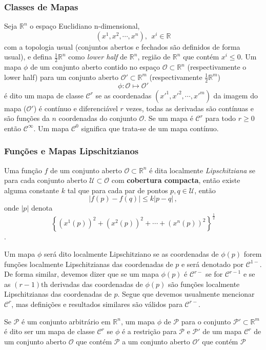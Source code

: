 \documentclass[25pt]{article}
\numberwithin{equation}{subsection} %
\newcommand{\Oop}{\mathcal{O}}
\newcommand{\Cop}{\mathcal{C}}
\newcommand{\Uop}{\mathcal{U}}
\newcommand{\Pop}{\mathcal{P}}
\newcommand{\Rbb}{\mathbb{R}}
\begin{document}
\subsubsection{Classes de Mapas}
Seja $\mathbb{R}^{n}$ o espaço Euclidiano n-dimensional, $$\left(x^1,x^2,\cdots,x^n\right),~~x^i\in\mathbb{R}$$ com a topologia usual (conjuntos abertos e fechados são definidos de forma usual), e defina $\frac{1}{2}\mathbb{R}^{n}$ como \textit{lower half} de $\mathbb{R}^{n}$, região de $\mathbb{R}^{n}$ que contém $x^{i}\leq 0$. Um mapa $\phi$ de um conjunto aberto contido no espaço $\mathcal{O}\subset\mathbb{R}^{n}$ (respectivamente o lower half) para um conjunto aberto $\mathcal{O}'\subset \mathbb{R}^{m}$ (respectivamente $\frac{1}{2}\mathbb{R}^{m}$) $$\phi:\mathcal{O}\mapsto\mathcal{O}'$$ é dito um mapa de classe $\mathcal{C}^{r}$ se as coordenadas $\left(x'^1,x'^2,\cdots,x'^m\right)$ da imagem do mapa ($\Oop'$) é contínuo e diferenciável $r$ vezes, todas as derivadas são contínuas e são funções da $n$ coordenadas do conjunto $\mathcal{O}$. Se um mapa é $\mathcal{C}^r$ para todo $r\geq 0$ então $\mathcal{C}^{\infty}$. Um mapa $\mathcal{C}^{0}$ significa que trata-se de um mapa contínuo.
\subsubsection{Funções e Mapas Lipschitzianos}
Uma função $f$ de um conjunto aberto $\Oop\subset\Rbb^n$ é dita localmente \textit{Lipschitziana} se para cada conjunto aberto $\Uop\subset\Oop$ com \textbf{cobertura compacta}, então existe alguma constante $k$ tal que para cada par de pontos $p,q\in\Uop$, então
\begin{equation}
\left|f(p)-f(q)\right|\leq k\left|p-q\right|\,,
\end{equation}
onde $|p|$ denota $$\left\{\left(x^{1}\left(p\right)\right)^2+\left(x^{2}\left(p\right)\right)^2+\cdots+\left(x^{n}\left(p\right)\right)^2\right\}^{\frac{1}{2}}$$.

Um mapa $\phi$ será dito localmente Lipschitziano se as coordenadas de $\phi(p)$ forem funções localmente Lipschitzianas das coordenadas de $p$ e será denotado por $\Cop^{1-}$. De forma similar, devemos dizer que se um mapa $\phi(p)$ é $\Cop^{r-}$ se for $\Cop^{r-1}$ e se as $\left(r-1\right)\text{th}$ derivadas das coordenadas de $\phi(p)$ são funções localmente Lipschitzianas das coordenadas de $p$. Segue que devemos usualmente mencionar $\Cop^{r}$, mas definições e resultados similares são válidos para $\Cop^{r-}$.

Se $\Pop$ é um conjunto arbitrário em $\Rbb^{n}$, um mapa $\phi$ de $\Pop$ para o conjunto $\Pop'\subset\Rbb^{m}$ é dito ser um mapa de classe $\Cop^{r}$ se $\phi$ é a restrição para $\Pop$ e $\Pop'$ de um mapa $\Cop^{r}$ de um conjunto aberto $\Oop$ que contém $\Pop$ a um conjunto aberto $\Oop'$ que contém $\Pop$
\end{document}

